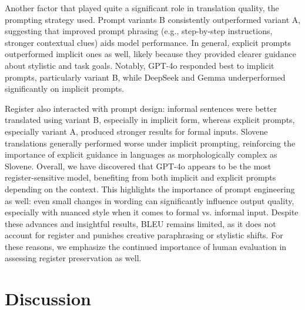 \documentclass[fleqn,moreauthors,10pt]{ds_report}
\begin{document}
Another factor that played quite a significant role in translation quality, the prompting strategy used. Prompt variants B consistently outperformed variant A, suggesting that improved prompt phrasing (e.g., step-by-step instructions, stronger contextual clues) aids model performance. In general, explicit prompts outperformed implicit ones as well, likely because they provided clearer guidance about stylistic and task goals. Notably, GPT-4o responded best to implicit prompts, particularly variant B, while DeepSeek and Gemma underperformed significantly on implicit prompts.


Register also interacted with prompt design: informal sentences were better translated using variant B, especially in implicit form, whereas explicit prompts, especially variant A, produced stronger results for formal inputs. Slovene translations generally performed worse under implicit prompting, reinforcing the importance of explicit guidance in languages as morphologically complex as Slovene.
Overall, we have discovered that GPT-4o appears to be the most register-sensitive model, benefiting from both implicit and explicit prompts depending on the context. This highlights the importance of prompt engineering as well: even small changes in wording can significantly influence output quality, especially with nuanced style when it comes to formal vs. informal input.
Despite these advances and insightful results, BLEU remains limited, as it does not account for register and punishes creative paraphrasing or stylistic shifts. For these reasons, we emphasize the continued importance of human evaluation in assessing register preservation as well.

		
		\section*{Discussion}
		
\end{document}

